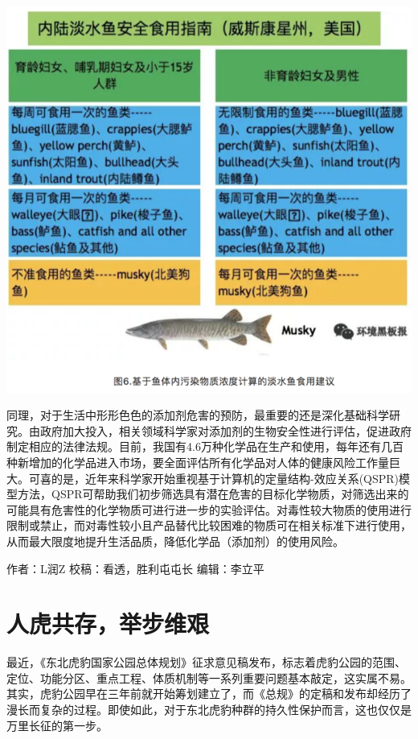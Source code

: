 \documentclass[
]{book}
\begin{document}
\includegraphics[width=8.33in]{images/epc6}

同理，对于生活中形形色色的添加剂危害的预防，最重要的还是深化基础科学研究。由政府加大投入，相关领域科学家对添加剂的生物安全性进行评估，促进政府制定相应的法律法规。目前，我国有4.6万种化学品在生产和使用，每年还有几百种新增加的化学品进入市场，要全面评估所有化学品对人体的健康风险工作量巨大。可喜的是，近年来科学家开始重视基于计算机的定量结构-效应关系(QSPR)模型方法，QSPR可帮助我们初步筛选具有潜在危害的目标化学物质，对筛选出来的可能具有危害性的化学物质可进行进一步的实验评估。对毒性较大物质的使用进行限制或禁止，而对毒性较小且产品替代比较困难的物质可在相关标准下进行使用，从而最大限度地提升生活品质，降低化学品（添加剂）的使用风险。

作者：L润Z
校稿：看透，胜利屯屯长
编辑：李立平

\hypertarget{ux4ebaux864eux5171ux5b58ux4e3eux6b65ux7ef4ux8270}{%
\section{人虎共存，举步维艰}\label{ux4ebaux864eux5171ux5b58ux4e3eux6b65ux7ef4ux8270}}

最近，《东北虎豹国家公园总体规划》征求意见稿发布，标志着虎豹公园的范围、定位、功能分区、重点工程、体质机制等一系列重要问题基本敲定，这实属不易。其实，虎豹公园早在三年前就开始筹划建立了，而《总规》的定稿和发布却经历了漫长而复杂的过程。即使如此，对于东北虎豹种群的持久性保护而言，这也仅仅是万里长征的第一步。
\end{document}
